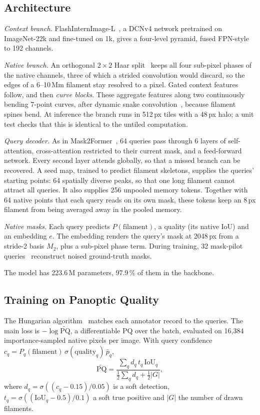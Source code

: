 \documentclass[sigconf]{acmart}
\begin{document}
\subsection{Architecture}
\emph{Context branch.} FlashInternImage-L~\cite{xiong2024dcnv4}, a DCNv4 network pretrained on ImageNet-22k and fine-tuned on 1k, gives a four-level pyramid, fused FPN-style to 192 channels.

\emph{Native branch.} An orthogonal $2\times2$ Haar split~\cite{xu2023haar} keeps all four sub-pixel phases of the native channels, three of which a strided convolution would discard, so the edges of a 6--10\,Mm filament stay resolved to a pixel. Gated context features follow, and then \emph{curve blocks}. These aggregate features along two continuously bending 7-point curves, after dynamic snake convolution~\cite{qi2023dsconv}, because filament spines bend. At inference the branch runs in 512\,px tiles with a 48\,px halo; a unit test checks that this is identical to the untiled computation.

\emph{Query decoder.} As in Mask2Former~\cite{cheng2022mask2former}, 64 queries pass through 6 layers of self-attention, cross-attention restricted to their current mask, and a feed-forward network. Every second layer attends globally, so that a missed branch can be recovered. A seed map, trained to predict filament skeletons, supplies the queries' starting points: 64 spatially diverse peaks, so that one long filament cannot attract all queries. It also supplies 256 unpooled memory tokens. Together with 64 native points that each query reads on its own mask, these tokens keep an 8\,px filament from being averaged away in the pooled memory.

\emph{Native masks.} Each query predicts $P(\text{filament})$, a quality (its native IoU) and an embedding $e$. The embedding renders the query's mask at 2048\,px from a stride-2 basis $M_2$, plus a sub-pixel phase term. During training, 32 mask-pilot queries~\cite{zhang2023mpformer} reconstruct noised ground-truth masks.

The model has 223.6\,M parameters, 97.9\,\% of them in the backbone.

\subsection{Training on Panoptic Quality}
The Hungarian algorithm~\cite{carion2020detr} matches each annotator record to the queries. The main loss is $-\log\widetilde{\mathrm{PQ}}$, a differentiable PQ over the batch, evaluated on 16,384 importance-sampled native pixels per image. With query confidence $c_q=P_q(\text{filament})\,\sigma(\text{quality}_q)\,\bar p_q$,
\begin{equation}
\widetilde{\mathrm{PQ}}=\frac{\sum_q d_q\,t_q\,\mathrm{IoU}_q}{\frac12\sum_q d_q+\frac12|G|},
\end{equation}
where $d_q=\sigma((c_q-0.15)/0.05)$ is a soft detection, $t_q=\sigma((\mathrm{IoU}_q-0.5)/0.1)$ a soft true positive and $|G|$ the number of drawn filaments.
\end{document}
